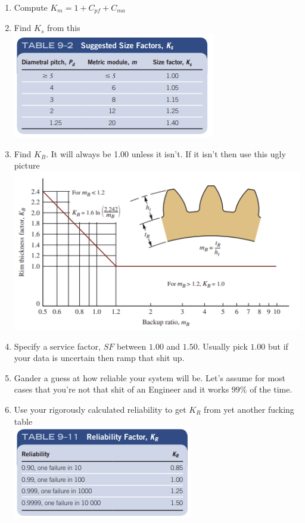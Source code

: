 \documentclass[11pt, fleqn]{article}
\begin{document}
\begin{enumerate}
    \item Compute $K_m=1+C_{pf}+C_{ma}$
    \item Find $K_s$ from this\\
    \includegraphics[scale=1]{Gears/9-2.png}
    \item Find $K_B$. It will always be 1.00 unless it isn't. If it isn't then use this ugly picture\\
    \includegraphics[scale=1]{Gears/Fig 9-14.png}
    \item Specify a service factor, $SF$ between $1.00$ and $1.50$. Usually pick $1.00$ but if your data is uncertain then ramp that shit up.
    \item Gander a guess at how reliable your system will be. Let's assume for most cases that you're not that shit of an Engineer and it works $99\%$ of the time.
    \item Use your rigorously calculated reliability to get $K_R$ from yet another fucking table\\
    \includegraphics[scale=1]{Gears/9-11.png}

\end{enumerate}
\end{document}
